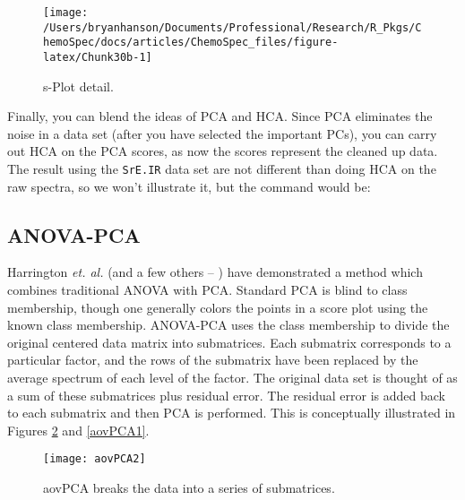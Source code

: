 \documentclass[letter,10pt,twocolumn,twoside,printwatermark=false]{pinp}
\begin{document}
\begin{figure}

{\centering \texttt{[image: /Users/bryanhanson/Documents/Professional/Research/R\_Pkgs/ChemoSpec/docs/articles/ChemoSpec\_files/figure-latex/Chunk30b-1]} 

}

\caption{\label{splot2}s-Plot detail.}\label{fig:Chunk30b}
\end{figure}

Finally, you can blend the ideas of PCA and HCA. Since PCA eliminates
the noise in a data set (after you have selected the important PCs), you
can carry out HCA on the PCA scores, as now the scores represent the
cleaned up data. The result using the \texttt{SrE.IR} data set are not
different than doing HCA on the raw spectra, so we won't illustrate it,
but the command would be:

\begin{Shaded}
\begin{Highlighting}[]
   \NormalTok{(}\OperatorTok{:}\NormalTok{),}
\end{Highlighting}
\end{Shaded}

\hypertarget{anova-pca}{%
\subsection{ANOVA-PCA}\label{anova-pca}}

Harrington \emph{et. al.}\citep{Harrington2005} (and a few others --
\cite{Pinto2008}) have demonstrated a method which combines traditional
ANOVA with PCA. Standard PCA is blind to class membership, though one
generally colors the points in a score plot using the known class
membership. ANOVA-PCA uses the class membership to divide the original
centered data matrix into submatrices. Each submatrix corresponds to a
particular factor, and the rows of the submatrix have been replaced by
the average spectrum of each level of the factor. The original data set
is thought of as a sum of these submatrices plus residual error. The
residual error is added back to each submatrix and then PCA is
performed. This is conceptually illustrated in Figures \ref{aovPCA2} and
\ref{aovPCA1}.

\begin{figure}
\begin{center}
\texttt{[image: aovPCA2]}
\caption{\label{aovPCA2}aovPCA breaks the data into a series of submatrices.}
\end{center}
\end{figure}
\end{document}
